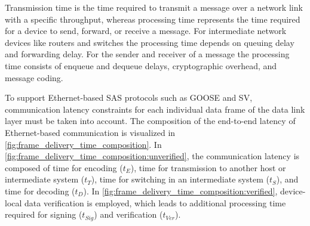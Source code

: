 Transmission time is the time required to transmit a message over a network link with a specific throughput, whereas processing time represents the time required for a device to send, forward, or receive a message.
For intermediate network devices like routers and switches the processing time depends on queuing delay and forwarding delay.
For the sender and receiver of a message the processing time consists of enqueue and dequeue delays, cryptographic overhead, and message coding.

To support Ethernet-based SAS protocols such as GOOSE and SV, communication latency constraints for each individual data frame of the data link layer must be taken into account.
The composition of the end-to-end latency of Ethernet-based communication is visualized in \autoref{fig:frame_delivery_time_composition}.
In \autoref{fig:frame_delivery_time_composition:unverified}, the communication latency is composed of time for encoding ($t_{E}$), time for transmission to another host or intermediate system ($t_{T}$), time for switching in an intermediate system ($t_{S}$), and time for decoding ($t_{D}$).
In \autoref{fig:frame_delivery_time_composition:verified}, device-local data verification is employed, which leads to additional processing time required for signing ($t_{Sig}$) and verification ($t_{Ver}$).
